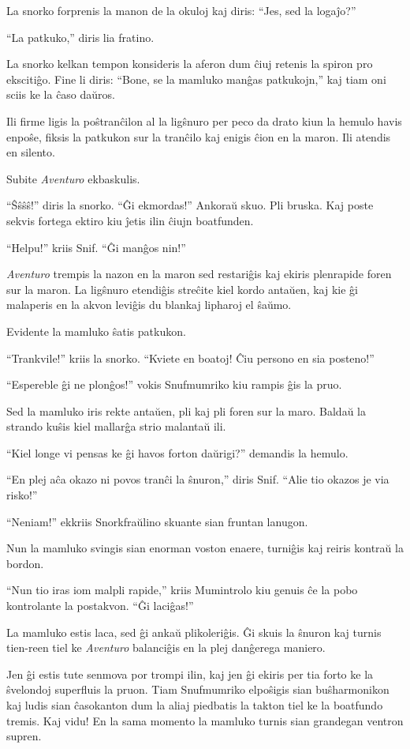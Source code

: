 La snorko forprenis la manon de la okuloj kaj diris: ``Jes, sed la logaĵo?''

``La patkuko,'' diris lia fratino.

La snorko kelkan tempon konsideris la aferon dum ĉiuj retenis la spiron pro ekscitiĝo. Fine li diris: ``Bone, se la mamluko manĝas patkukojn,'' kaj tiam oni sciis ke la ĉaso daŭros.

Ili firme ligis la poŝtranĉilon al la ligŝnuro per peco da drato kiun la hemulo havis enpoŝe, fiksis la patkukon sur la tranĉilo kaj enigis ĉion en la maron. Ili atendis en silento.

Subite \emph{Aventuro} ekbaskulis.

``Ŝŝŝŝ!'' diris la snorko. ``Ĝi ekmordas!'' Ankoraŭ skuo. Pli bruska. Kaj poste sekvis fortega ektiro kiu ĵetis ilin ĉiujn boatfunden.

``Helpu!'' kriis Snif. ``Ĝi manĝos nin!''

\emph{Aventuro} trempis la nazon en la maron sed restariĝis kaj ekiris plenrapide foren sur la maron. La ligŝnuro etendiĝis streĉite kiel kordo antaŭen, kaj kie ĝi malaperis en la akvon leviĝis du blankaj lipharoj el ŝaŭmo.

Evidente la mamluko ŝatis patkukon.

``Trankvile!'' kriis la snorko. ``Kviete en boatoj! Ĉiu persono en sia posteno!''

``Espereble ĝi ne plonĝos!'' vokis Snufmumriko kiu rampis ĝis la pruo.

Sed la mamluko iris rekte antaŭen, pli kaj pli foren sur la maro. Baldaŭ la strando kuŝis kiel mallarĝa strio malantaŭ ili.

``Kiel longe vi pensas ke ĝi havos forton daŭrigi?'' demandis la hemulo.

``En plej aĉa okazo ni povos tranĉi la ŝnuron,'' diris Snif. ``Alie tio okazos je via risko!''

``Neniam!'' ekkriis Snorkfraŭlino skuante sian fruntan lanugon.

Nun la mamluko svingis sian enorman voston enaere, turniĝis kaj reiris kontraŭ la bordon.

``Nun tio iras iom malpli rapide,'' kriis Mumintrolo kiu genuis ĉe la pobo kontrolante la postakvon. ``Ĝi laciĝas!''

La mamluko estis laca, sed ĝi ankaŭ plikoleriĝis. Ĝi skuis la ŝnuron kaj turnis tien-reen tiel ke \emph{Aventuro} balanciĝis en la plej danĝerega maniero.

Jen ĝi estis tute senmova por trompi ilin, kaj jen ĝi ekiris per tia forto ke la ŝvelondoj superfluis la pruon. Tiam Snufmumriko elpoŝigis sian buŝharmonikon kaj ludis sian ĉasokanton dum la aliaj piedbatis la takton tiel ke la boatfundo tremis. Kaj vidu! En la sama momento la mamluko turnis sian grandegan ventron supren.

